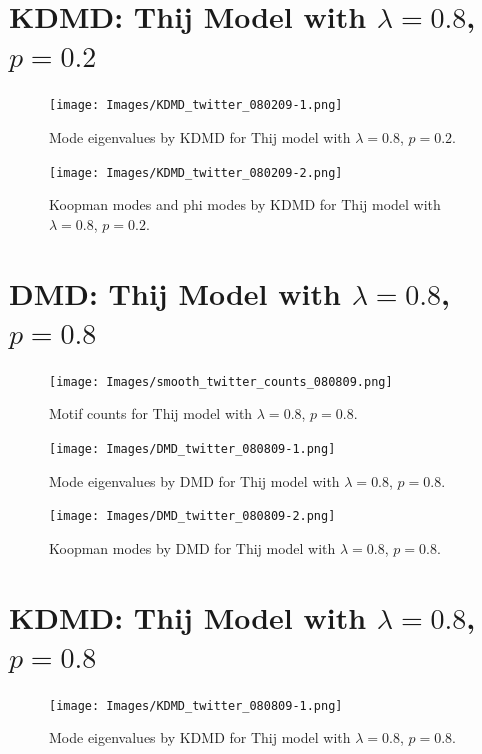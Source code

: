 \clearpage
\section{KDMD: Thij Model with $\lambda=0.8$, $p=0.2$}


\begin{figure}
    \texttt{[image: Images/KDMD\_twitter\_080209-1.png]}
    \centering
    \caption{Mode eigenvalues by KDMD for Thij model
    with $\lambda=0.8$, $p=0.2$.}
\end{figure}

\begin{figure}
    \texttt{[image: Images/KDMD\_twitter\_080209-2.png]}
    \centering
    \caption{Koopman modes and phi modes by KDMD for Thij model
    with $\lambda=0.8$, $p=0.2$.}
\end{figure}

\FloatBarrier

\clearpage

\section{DMD: Thij Model with $\lambda=0.8$, $p=0.8$}
\begin{figure}
    \texttt{[image: Images/smooth\_twitter\_counts\_080809.png]}
    \centering
    \caption{Motif counts for Thij model with $\lambda=0.8$, $p=0.8$.}
    \label{fig:pthij0808}
\end{figure}

\clearpage

\begin{figure}
    \texttt{[image: Images/DMD\_twitter\_080809-1.png]}
    \centering
    \caption{Mode eigenvalues by DMD for Thij model
    with $\lambda=0.8$, $p=0.8$.}
    \label{fig:dmd08081}
\end{figure}

\begin{figure}
    \texttt{[image: Images/DMD\_twitter\_080809-2.png]}
    \centering
    \caption{Koopman modes by DMD for Thij model
    with $\lambda=0.8$, $p=0.8$.}
    \label{fig:dmd08082}
\end{figure}

\clearpage
\section{KDMD: Thij Model with $\lambda=0.8$, $p=0.8$}

\begin{figure}
    \texttt{[image: Images/KDMD\_twitter\_080809-1.png]}
    \centering
    \caption{Mode eigenvalues by KDMD for Thij model
    with $\lambda=0.8$, $p=0.8$.}
    \label{fig:dmd08083}
\end{figure}

